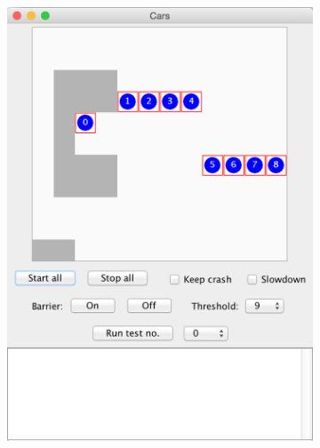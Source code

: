 \begin{figure}[H]
\centering
\caption{The cars driving around the parking lot}
\begin{subfigure}[b]{0.4\textwidth}
\includegraphics[scale=0.3]{./graphics/Cars1.png}
\end{subfigure}
\begin{subfigure}[b]{0.4\textwidth}

\end{subfigure}
\end{figure}
